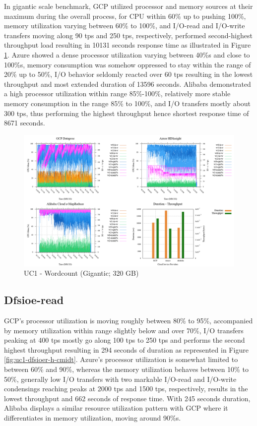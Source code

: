 \documentclass[review]{elsarticle}
\begin{document}
In gigantic scale benchmark, GCP utilized processor and memory sources at their maximum during the overall process, for CPU within 60\% up to pushing 100\%, memory utilization varying between 60\% to 100\%, and I/O-read and I/O-write transfers moving along 90 tps and 250 tps, respectively, performed second-highest throughput load resulting in 10131 seconds response time as illustrated in Figure \ref{fig:uc1-wrdcnt-g-cmidt}. Azure showed a dense processor utilization varying between 40\%s and close to 100\%s, memory consumption was somehow oppressed to stay within the range of 20\% up to 50\%, I/O behavior seldomly reacted over 60 tps resulting in the lowest throughput and most extended duration of 13596 seconds. Alibaba demonstrated a high processor utilization within range 85\%-100\%, relatively more stable memory consumption in the range 85\% to 100\%, and I/O transfers mostly about 300 tps, thus performing the highest throughput hence shortest response time of 8671 seconds.

\begin{figure}[p]
	\caption{UC1 - Wordcount (Gigantic; 320 GB)}
	\label{fig:uc1-wrdcnt-g-cmidt}
	\includegraphics[width=\textwidth]{uc1-wrdcnt-g-cmidt}
	\centering
\end{figure}


\subsection{Dfsioe-read}
GCP's processor utilization is moving roughly between 80\% to 95\%, accompanied by memory utilization within range slightly below and over 70\%, I/O transfers peaking at 400 tps mostly go along 100 tps to 250 tps and performs the second highest throughput resulting in 294 seconds of duration as represented in Figure \ref{fig:uc1-dfsioer-h-cmidt}. Azure's processor utilization is somewhat limited to between 60\% and 90\%, whereas the memory utilization behaves between 10\% to 50\%, generally low I/O transfers with two markable I/O-read and I/O-write condensings reaching peaks at 2000 tps and 1500 tps, respectively, results in the lowest throughput and 662 seconds of response time. With 245 seconds duration, Alibaba displays a similar resource utilization pattern with GCP where it differentiates in memory utilization, moving around 90\%s.
\end{document}

